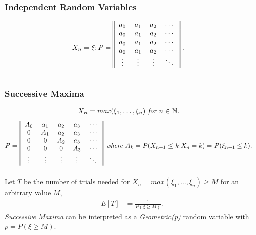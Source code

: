 \documentclass{article}
\begin{document}
\subsubsection{Independent Random Variables}
\begin{align*}
    X_n = \xi; P & = 
    \begin{blockarray}{cccc}
        \begin{block}{||cccc||}
            a_0 & a_1 & a_2 & \cdots \\
            a_0 & a_1 & a_2 & \cdots \\
            a_0 & a_1 & a_2 & \cdots \\
            a_0 & a_1 & a_2 & \cdots \\
            \vdots & \vdots & \vdots &  \ddots \\
        \end{block} 
    \end{blockarray}\; .
\end{align*}

\subsubsection{Successive Maxima}
\begin{align*}
    X_n & = max(\xi_1, \dots, \xi_n) \emph{ for } n\in \mathbb{N}.
\end{align*}
\begin{align*}
    P & = 
        \begin{blockarray}{ccccc}
            \begin{block}{||ccccc||}
                A_0 & a_1 & a_2 & a_3 & \cdots \\
                0 & A_1 & a_2 & a_3 & \cdots \\
                0 & 0 & A_2 & a_3 & \cdots \\
                0 & 0 & 0 & A_3 & \cdots \\
                \vdots & \vdots & \vdots & \vdots & \ddots \\
            \end{block} 
        \end{blockarray} \emph{ where }A_k = P(X_{n+1} \le k | X_n = k) = P(\xi_{n+1} \le k).
\end{align*}
Let $T$ be the number of trials needed for $X_n = max(\xi_1, \dots, \xi_n)\ge M$ for an arbitrary value $M$,
\begin{align*}
    E[T] & = \frac{1}{P(\xi \ge M)}.
\end{align*}
\emph{Successive Maxima} can be interpreted as a \emph{Geometric(p)} random variable with $p = P(\xi \ge M)$.
\end{document}

